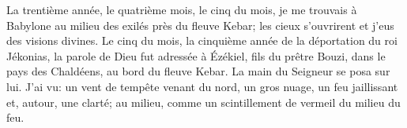 La trentième année, le quatrième mois, le cinq du mois,
	je me trouvais à Babylone au milieu des exilés près du fleuve Kebar;
	les cieux s’ouvrirent et j’eus des visions divines.
Le cinq du mois, la cinquième année de la déportation du roi Jékonias,
	la parole de Dieu fut adressée à Ézékiel, fils du prêtre Bouzi,
	dans le pays des Chaldéens, au bord du fleuve Kebar.
La main du Seigneur se posa sur lui.
J’ai vu: un vent de tempête venant du nord, un gros nuage, un feu jaillissant
	et, autour, une clarté;
	au milieu, comme un scintillement de vermeil du milieu du feu.
